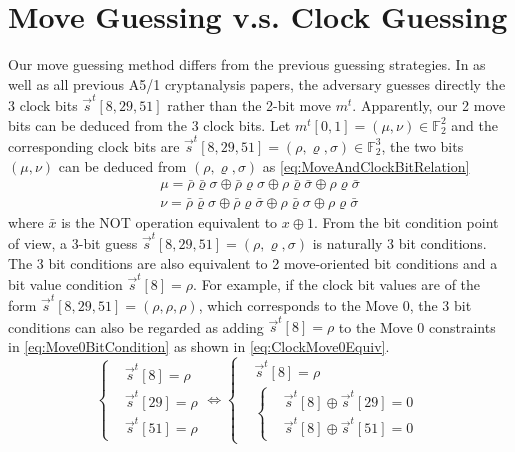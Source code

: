 \section{Move Guessing v.s. Clock Guessing}\label{sec:MoveVsClockGuess}
Our move guessing method differs from the previous guessing strategies.
In \cite{AC:Zhang19} as well as all previous A5/1 cryptanalysis papers, the adversary guesses directly the 3 clock bits $\vec{s}^t[8,29,51]$ rather than the 2-bit move $m^t$.
Apparently, our 2 move bits can be deduced from the 3 clock bits.
Let $m^t[0,1]=(\mu, \nu)\in \mathbb{F}_2^2$ and the corresponding clock bits are $\vec{s}^t[8,29,51]=(\rho,\varrho, \sigma)\in \mathbb{F}_2^3$, the two bits $(\mu, \nu)$ can be deduced from $(\rho,\varrho, \sigma)$ as \eqref{eq:MoveAndClockBitRelation}
\begin{equation}\label{eq:MoveAndClockBitRelation}
\begin{aligned}
  \mu=\bar{\rho}\bar{\varrho}\sigma \oplus
  \bar{\rho}\varrho \sigma \oplus
  \rho \bar{\varrho} \bar{\sigma} \oplus
  \rho \varrho \bar{\sigma} \\
  \nu=\bar{\rho}\bar{\varrho}\sigma \oplus
  \bar{\rho}\varrho\bar{\sigma} \oplus
  \rho\bar{\varrho}\sigma \oplus
  \rho \varrho \bar{\sigma}
\end{aligned}
\end{equation}
where $\bar{x}$ is the NOT operation equivalent to $x\oplus 1$.
From the bit condition point of view, a 3-bit guess  $\vec{s}^t[8,29,51]=(\rho,\varrho, \sigma)$ is naturally 3 bit conditions.
The 3 bit conditions are also equivalent to 2 move-oriented  bit conditions and a bit value condition $\vec{s}^t[8]=\rho$.
For example, if the clock bit values are of the form $\vec{s}^t[8,29,51]=(\rho, \rho, \rho)$, which corresponds to the Move 0, the 3 bit conditions can also be regarded as adding $\vec{s}^t[8]=\rho$ to the Move 0 constraints in \eqref{eq:Move0BitCondition} as shown in \eqref{eq:ClockMove0Equiv}.
\begin{equation}\label{eq:ClockMove0Equiv}
  \left\{
  \begin{aligned}
    &\vec{s}^t[8]=\rho\\
    &\vec{s}^t[29]=\rho\\
    &\vec{s}^t[51]=\rho
  \end{aligned}
  \right.
  \Leftrightarrow
  \left\{
    \begin{aligned}
  &\vec{s}^t[8]=\rho\\
  &\left\{
  \begin{aligned}
    &\vec{s}^t[8]\oplus\vec{s}^t[29]=0\\
    &\vec{s}^t[8]\oplus\vec{s}^t[51]=0
  \end{aligned}
  \right.
    \end{aligned}
  \right.
\end{equation}

